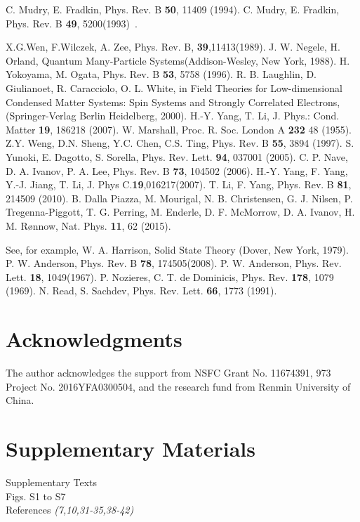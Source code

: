 \documentclass[12pt]{article}
\begin{document}
\begin{thebibliography}{99}
C. Mudry, E. Fradkin, Phys. Rev. B \textbf{50}, 11409 (1994).
C. Mudry, E. Fradkin, Phys. Rev. B \textbf{49}, 5200(1993) .

X.G.Wen, F.Wilczek, A. Zee, Phys. Rev. B, \textbf{39},11413(1989). 
J. W. Negele, H. Orland, Quantum Many-Particle Systems(Addison-Wesley, New York, 1988).
H. Yokoyama, M. Ogata, Phys. Rev. B \textbf{53}, 5758 (1996).
R. B. Laughlin, D. Giulianoet, R. Caracciolo, O. L. White, in Field Theories for Low-dimensional Condensed Matter Systems: Spin Systems and Strongly Correlated Electrons, (Springer-Verlag Berlin Heidelberg, 2000).
H.-Y. Yang, T. Li, J. Phys.: Cond. Matter \textbf{19}, 186218 (2007).
W. Marshall, Proc. R. Soc. London A \textbf{232} 48 (1955).
Z.Y. Weng, D.N. Sheng, Y.C. Chen, C.S. Ting, Phys. Rev. B \textbf{55}, 3894 (1997).
S. Yunoki, E. Dagotto, S. Sorella, Phys. Rev. Lett. \textbf{94}, 037001 (2005).
C. P. Nave, D. A. Ivanov, P. A. Lee, Phys. Rev. B \textbf{73}, 104502 (2006).
H.-Y. Yang, F. Yang, Y.-J. Jiang, T. Li, J. Phys C.\textbf{19},016217(2007).
T. Li, F. Yang, Phys. Rev. B \textbf{81}, 214509 (2010).
B. Dalla Piazza, M. Mourigal, N. B. Christensen, G. J. Nilsen, P. Tregenna-Piggott, T. G. Perring, M. Enderle, D. F. McMorrow, D. A. Ivanov, H. M. R{\o}nnow, Nat. Phys. \textbf{11}, 62 (2015).

See, for example, W. A. Harrison, Solid State Theory (Dover, New York, 1979).
P. W. Anderson, Phys. Rev. B \textbf{78}, 174505(2008).
P. W. Anderson, Phys. Rev. Lett. \textbf{18}, 1049(1967).
P. Nozieres, C. T. de Dominicis, Phys. Rev. \textbf{178}, 1079 (1969).
N. Read, S. Sachdev, Phys. Rev. Lett. \textbf{66}, 1773 (1991).




\end{thebibliography}

\section*{Acknowledgments}
The author acknowledges the support from NSFC Grant No. 11674391, 973 Project No. 2016YFA0300504, and the research fund from Renmin University of China. 

\section*{Supplementary Materials}
Supplementary Texts\\
Figs. S1 to S7\\
References \textit{(7,10,31-35,38-42)}
\end{document}
